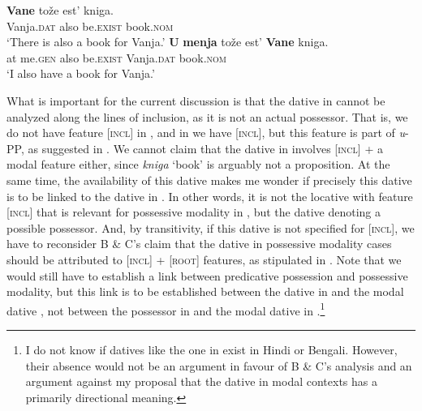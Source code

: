 \documentclass[output=paper,colorlinks,citecolor=brown,nonflat]{./langscibook}
\begin{document}
\ea%
    \label{ex:tsedryk:13}
    \ea\label{ex:tsedryk:13a}
    \gll    \textbf{Vane}         {tože}    {est’}           {kniga.}\\
            Vanja.\textsc{dat}   also   be.\textsc{exist}   book.\textsc{nom}\\
    \glt    ‘There is also a book for Vanja.’
    \ex\label{ex:tsedryk:13b}
    \gll    \textbf{U} \textbf{menja}     {tože}   {est’}           \textbf{{Vane}}         {kniga.}\\
            at me.\textsc{gen}    also   be.\textsc{exist}   Vanja.\textsc{dat}   book.\textsc{nom}\\
    \glt    ‘I also have a book for Vanja.’
    \z
\z

What is important for the current discussion is that the dative in  cannot be analyzed along the lines of inclusion, as it is not an actual possessor. That is, we do not have feature [\textsc{incl}] in , and in  we have [\textsc{incl}], but this feature is part of \textit{u}{}-PP, as suggested in . We cannot claim that the dative in  involves [\textsc{incl}] + a modal feature either, since \textit{kniga} ‘book’ is arguably not a proposition. At the same time, the availability of this dative makes me wonder if precisely this dative is to be linked to the dative in . In other words, it is not the locative with feature [\textsc{incl}] that is relevant for possessive modality in , but the dative denoting a possible possessor. And, by transitivity, if this dative is not specified for [\textsc{incl}], we have to reconsider B \& C’s claim that the dative in possessive modality cases should be attributed to [\textsc{incl}] + [\textsc{root}] features, as stipulated in . Note that we would still have to establish a link between predicative possession and possessive modality, but this link is to be established between the dative in  and the modal dative , not between the possessor in  and the modal dative in .\footnote{I do not know if datives like the one in  exist in Hindi or Bengali. However, their absence would not be an argument in favour of B \& C’s analysis and an argument against my proposal that the dative in modal contexts has a primarily directional meaning.}   
\end{document}
